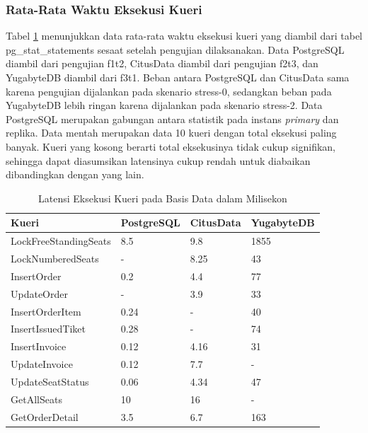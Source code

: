 \subsubsection{Rata-Rata Waktu Eksekusi Kueri}

Tabel \ref{table:latensi-kueri} menunjukkan data rata-rata waktu eksekusi kueri yang diambil dari tabel pg\_stat\_statements sesaat setelah pengujian dilaksanakan. Data PostgreSQL diambil dari pengujian f1t2, CitusData diambil dari pengujian f2t3, dan YugabyteDB diambil dari f3t1. Beban antara PostgreSQL dan CitusData sama karena pengujian dijalankan pada skenario stress-0, sedangkan beban pada YugabyteDB lebih ringan karena dijalankan pada skenario stress-2. Data PostgreSQL merupakan gabungan antara statistik pada instans \textit{primary} dan replika. Data mentah merupakan data 10 kueri dengan total eksekusi paling banyak. Kueri yang kosong berarti total eksekusinya tidak cukup signifikan, sehingga dapat diasumsikan latensinya cukup rendah untuk diabaikan dibandingkan dengan yang lain.

\begin{table}[H]
    \centering
    \caption{Latensi Eksekusi Kueri pada Basis Data dalam Milisekon}
    \label{table:latensi-kueri}
    \begin{tabular}{|l|l|l|l|}
        \hline
        \textbf{Kueri}        & \textbf{PostgreSQL} & \textbf{CitusData} & \textbf{YugabyteDB} \\
        \hline
        LockFreeStandingSeats & 8.5                 & 9.8                & 1855                \\
        \hline
        LockNumberedSeats     & -                   & 8.25               & 43                  \\
        \hline
        InsertOrder           & 0.2                 & 4.4                & 77                  \\
        \hline
        UpdateOrder           & -                   & 3.9                & 33                  \\
        \hline
        InsertOrderItem       & 0.24                & -                  & 40                  \\
        \hline
        InsertIssuedTiket     & 0.28                & -                  & 74                  \\
        \hline
        InsertInvoice         & 0.12                & 4.16               & 31                  \\
        \hline
        UpdateInvoice         & 0.12                & 7.7                & -                   \\
        \hline
        UpdateSeatStatus      & 0.06                & 4.34               & 47                  \\
        \hline
        GetAllSeats           & 10                  & 16                 & -                   \\
        \hline
        GetOrderDetail        & 3.5                 & 6.7                & 163                 \\
        \hline
    \end{tabular}
\end{table}

